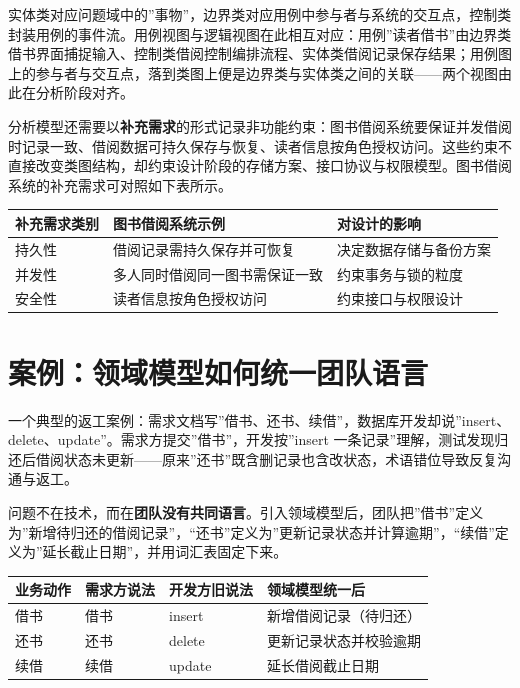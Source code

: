 \documentclass[12pt,a4paper,twoside,openany]{ctexbook}
\numberwithin{figure}{chapter}
\numberwithin{table}{chapter}
\newcounter{none}
\begin{document}
实体类对应问题域中的''事物''，边界类对应用例中参与者与系统的交互点，控制类封装用例的事件流。用例视图与逻辑视图在此相互对应：用例''读者借书''由边界类借书界面捕捉输入、控制类借阅控制编排流程、实体类借阅记录保存结果；用例图上的参与者与交互点，落到类图上便是边界类与实体类之间的关联------两个视图由此在分析阶段对齐。

分析模型还需要以\textbf{补充需求}的形式记录非功能约束：图书借阅系统要保证并发借阅时记录一致、借阅数据可持久保存与恢复、读者信息按角色授权访问。这些约束不直接改变类图结构，却约束设计阶段的存储方案、接口协议与权限模型。图书借阅系统的补充需求可对照如下表所示。

{\def\LTcaptype{none} %
\begin{longtable}[]{@{}lll@{}}
\toprule\noalign{}
补充需求类别 & 图书借阅系统示例 & 对设计的影响 \\
\midrule\noalign{}
\endhead
\bottomrule\noalign{}
\endlastfoot
持久性 & 借阅记录需持久保存并可恢复 & 决定数据存储与备份方案 \\
并发性 & 多人同时借阅同一图书需保证一致 & 约束事务与锁的粒度 \\
安全性 & 读者信息按角色授权访问 & 约束接口与权限设计 \\
\end{longtable}
}

\section{案例：领域模型如何统一团队语言}\label{ux6848ux4f8bux9886ux57dfux6a21ux578bux5982ux4f55ux7edfux4e00ux56e2ux961fux8bedux8a00}

一个典型的返工案例：需求文档写''借书、还书、续借''，数据库开发却说''insert、delete、update''。需求方提交''借书''，开发按''insert
一条记录''理解，测试发现归还后借阅状态未更新------原来''还书''既含删记录也含改状态，术语错位导致反复沟通与返工。

问题不在技术，而在\textbf{团队没有共同语言}。引入领域模型后，团队把''借书''定义为''新增待归还的借阅记录''，``还书''定义为''更新记录状态并计算逾期''，``续借''定义为''延长截止日期''，并用词汇表固定下来。

{\def\LTcaptype{none} %
\begin{longtable}[]{@{}llll@{}}
\toprule\noalign{}
业务动作 & 需求方说法 & 开发方旧说法 & 领域模型统一后 \\
\midrule\noalign{}
\endhead
\bottomrule\noalign{}
\endlastfoot
借书 & 借书 & insert & 新增借阅记录（待归还） \\
还书 & 还书 & delete & 更新记录状态并校验逾期 \\
续借 & 续借 & update & 延长借阅截止日期 \\
\end{longtable}
}
\end{document}
